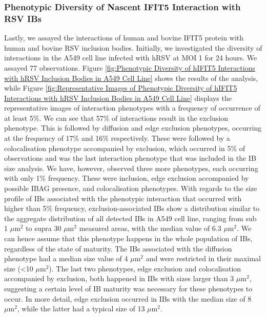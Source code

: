 \subsubsection{Phenotypic Diversity of Nascent IFIT5 Interaction with RSV IBs}
Lastly, we assayed the interactions of human and bovine IFIT5 protein with human and bovine RSV inclusion bodies. Initially, we investigated the diversity of interactions in the A549 cell line infected with hRSV at MOI 1 for 24 hours. We assayed 77 observations. Figure \ref{fig:Phenotypic Diversity of hIFIT5 Interactions with hRSV Inclusion Bodies in A549 Cell Line} shows the results of the analysis, while Figure \ref{fig:Representative Images of Phenotypic Diversity of hIFIT5 Interactions with hRSV Inclusion Bodies in A549 Cell Line} displays the representative images of interaction phenotypes with a frequency of occurrence of at least 5\%. We can see that 57\% of interactions result in the exclusion phenotype. This is followed by diffusion and edge exclusion phenotypes, occurring at the frequency of 17\% and 16\% respectively. These were followed by a colocalisation phenotype accompanied by exclusion, which occurred in 5\% of observations and was the last interaction phenotype that was included in the IB size analysis. We have, however, observed three more phenotypes, each occurring with only 1\% frequency. These were inclusion, edge exclusion accompanied by possible IBAG presence, and colocalisation phenotypes. With regards to the size profile of IBs associated with the phenotypic interaction that occurred with higher than 5\% frequency, exclusion-associated IBs show a distribution similar to the aggregate distribution of all detected IBs in A549 cell line, ranging from sub 1 \(\mu \mbox{m}^2\) to supra 30 \(\mu \mbox{m}^2\) measured areas, with the median value of 6.3 \(\mu \mbox{m}^2\). We can hence assume that this phenotype happens in the whole population of IBs, regardless of the state of maturity. The IBs associated with the diffusion phenotype had a median size value of 4 \(\mu \mbox{m}^2\) and were restricted in their maximal size (<10 \(\mu \mbox{m}^2\)). The last two phenotypes, edge exclusion and colocalisation accompanied by exclusion, both happened in IBs with sizes larger than 3 \(\mu \mbox{m}^2\), suggesting a certain level of IB maturity was necessary for these phenotypes to occur. In more detail, edge exclusion occurred in IBs with the median size of 8 \(\mu \mbox{m}^2\), while the latter had a typical size of 13 \(\mu \mbox{m}^2\).

